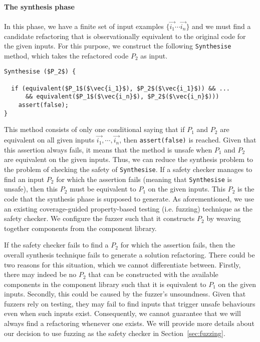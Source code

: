 \documentclass[sigconf,review,anonymous]{acmart}
\begin{document}
\paragraph{The synthesis phase} In this phase, we have 
a finite set of input examples $\{\vec{i_1} \cdots \vec{i_n}\}$ and we must find a candidate refactoring
that is observationally equivalent to the original code for the given inputs.
For this purpose, we construct the following \texttt{Synthesise} method, which
takes the refactored code $P_2$ as input.

\begin{lstlisting}[mathescape=true,showstringspaces=false]
Synthesise ($P_2$) {

  if (equivalent($P_1$($\vec{i_1}$), $P_2$($\vec{i_1}$)) && ...
      && equivalent($P_1$($\vec{i_n}$), $P_2$($\vec{i_n}$)))
    assert(false);
}
\end{lstlisting}

This method consists of only one conditional saying that if $P_1$ and $P_2$ are equivalent on all given inputs $\vec{i_1}, \cdots, \vec{i_n}$, then \texttt{assert(false)} is reached.
Given that this assertion always fails, it means that the method is unsafe when $P_1$ and $P_2$ are equivalent on the given inputs.
Thus, we can reduce the synthesis problem to the problem of checking the safety of \texttt{Synthesise}. If a safety checker manages to
find an input $P_2$ for which the assertion fails (meaning that \texttt{Synthesise} is unsafe), then this $P_2$ must be equivalent to $P_1$ on the given inputs. This $P_2$ is the code
that the synthesis phase is supposed to generate. As aforementioned, we use an existing coverage-guided property-based testing (i.e. fuzzing) technique
as the safety checker. We configure the fuzzer such that it constructs $P_2$ by weaving together components from the component library.

If the safety checker fails to find a $P_2$ for which the assertion fails, then the overall synthesis technique fails to generate a solution refactoring.
There could be two reasons for this situation, which we cannot differentiate between.
Firstly, there may indeed be no $P_2$ that can be constructed with the available components in the component library such that
it is equivalent to $P_1$ on the given inputs. Secondly, this could be caused by the fuzzer's unsoundness.
Given that fuzzers rely on testing, they may fail to find inputs that trigger unsafe behaviours even when such inputs exist.
Consequently, we cannot guarantee that we will always find a refactoring whenever one exists. We will provide more details about our decision to use fuzzing as the safety checker in 
Section~\ref{sec:fuzzing}.
\end{document}
